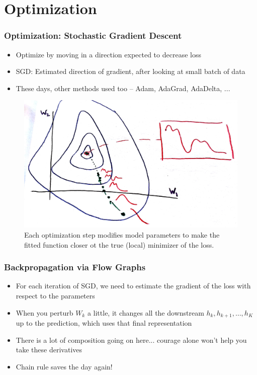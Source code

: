 \documentclass[10pt,mathserif]{beamer}
\begin{document}
\section{Optimization}
\label{sec:optimization}


\begin{frame}
  \frametitle{Optimization: Stochastic Gradient Descent}
  \begin{itemize}
  \item Optimize by moving in a direction expected to decrease loss
  \item SGD: Estimated direction of gradient, after looking at small batch of
    data
  \item These days, other methods used too -- Adam, AdaGrad, AdaDelta, ...
  \end{itemize}
\begin{figure}[ht]
  \centering
  \includegraphics[width=0.6\paperwidth]{figure/sgd_example}
  \caption{Each optimization step modifies model parameters to make the fitted
    function closer ot the true (local) minimizer of the loss.
    \label{fig:sgd_example} }
\end{figure}
\end{frame}

\begin{frame}
  \frametitle{Backpropagation via Flow Graphs}
  \begin{itemize}
  \item For each iteration of SGD, we need to estimate the gradient of the loss
    with respect to the parameters
  \item When you perturb $W_k$ a little, it changes all the downstream $h_k, h_{k +
    1}, \dots, h_{K}$ up to the prediction, which uses that final representation
  \item There is a lot of composition going on here... courage alone won't help
    you take these derivatives
  \item Chain rule saves the day again!
  \end{itemize}
\end{frame}
\end{document}
